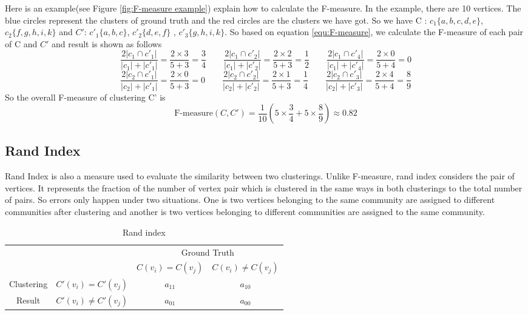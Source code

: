 \documentclass[12pt,oneside,final]{vlsithesis}
\begin{document}
Here is an example(see Figure \ref{fig:F-measure example}) explain how to calculate the F-measure. In the example, there are 10 vertices. The blue circles represent the clusters of ground truth and the red  circles are the clusters we have got. So we have C : $c_{1}\{a,b,c,d,e\}$, $c_{2} \{f,g,h,i,k \}$ and $C'$: $c'_{1}\{ a,b,c\}$, $c'_{2} \{d,e,f\}$ , $c'_{3} \{g,h,i,k\}$. So based on equation \ref{equ:F-measure}, we calculate the F-measure of each pair of C and $C'$ and result is shown as follows
\begin{equation*}
	\frac{2|c_{1}\cap c'_{1}|}{|c_{1}|+|c'_{1}|} = \frac{2 \times 3}{5 + 3} = \frac{3}{4}   \qquad	\frac{2|c_{1}\cap c'_{2}|}{|c_{1}|+|c'_{2}|} = \frac{2 \times 2}{5 + 3} = \frac{1}{2}  \qquad 
	\frac{2|c_{1}\cap c'_{4}|}{|c_{1}|+|c'_{4}|} = \frac{2 \times 0}{5 + 4} = 0
\end{equation*}
\begin{equation*}
	\frac{2|c_{2}\cap c'_{1}|}{|c_{2}|+|c'_{1}|} = \frac{2 \times 0}{5 + 3} = 0   \qquad   \frac{2|c_{2}\cap c'_{2}|}{|c_{2}|+|c'_{2}|} = \frac{2 \times 1}{5 + 3} = \frac{1}{4} \qquad
	\frac{2|c_{2}\cap c'_{3}|}{|c_{2}|+|c'_{3}|} = \frac{2 \times 4}{5 + 4} = \frac{8}{9}
\end{equation*}
So the overall F-measure of clustering C' is  
\begin{equation*}
\mbox{F-measure}(C, C') = \frac{1}{10} (5 \times \frac{3}{4} + 5 \times \frac{8}{9} ) \approx 0.82
\end{equation*}
\subsection{Rand Index}
Rand Index \cite{rand1971objective} is also a measure used to evaluate the similarity between two clusterings. Unlike F-measure, rand index considers the pair of vertices. It represents the fraction of the number of vertex pair which is clustered in the same ways in both clusterings to the total number of pairs. So errors only happen under two situations. One is two vertices belonging to the same community are assigned to different communities after clustering and another is two vertices belonging to different communities are assigned to the same community.
\begin{table*}[h]
	\centering
	\begin{tabular}{|c c|c c|} \hline
		& & \multicolumn{2}{|c|}{Ground Truth} \\  
		& & $C(v_{i}) = C(v_{j})$ &  $C(v_{i}) \neq C(v_{j})$ \\ \hline
		Clustering &  $C'(v_{i}) = C'(v_{j})$ & $ a_{11} $ & $a_{10}$ \\ 
		Result & $C'(v_{i}) \neq C'(v_{j})$ & $ a_{01} $ & $a_{00}$ \\ \hline
	\end{tabular}
	\caption{Rand index}
	\label{tab:rand index}
\end{table*}
\end{document}
